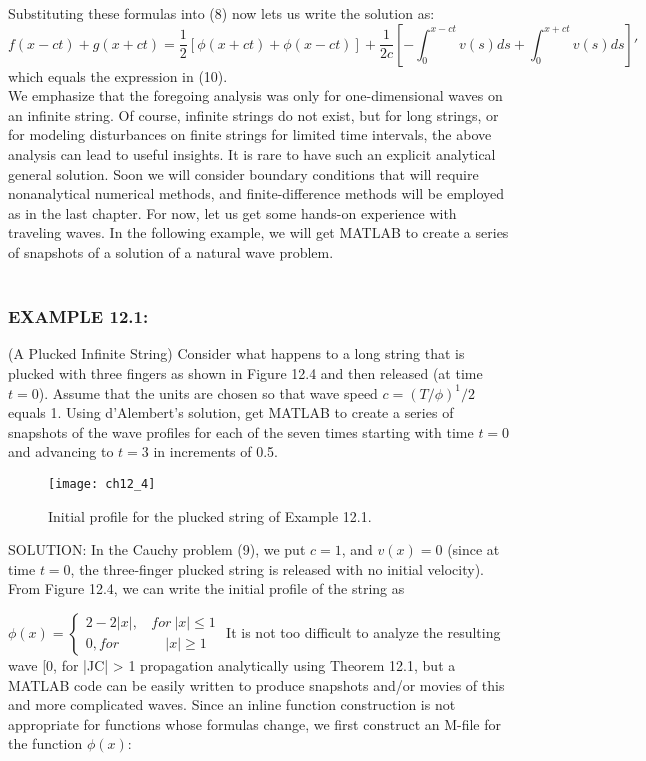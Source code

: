 \documentclass[../main.tex]{subfiles}
\begin{document}
Substituting these formulas into (8) now lets us write the solution as: 
$$f(x-ct) + g(x + ct)=\dfrac{1}{2} [\phi(x+ct)+\phi(x-ct)]+\dfrac{1}{2c} [-\int_{0}^{x-ct} v(s)ds+\int_{0}^{x+ct} v(s)ds]'$$
which equals the expression in (10). 
\\

We emphasize that the foregoing analysis was only for one-dimensional waves
on an infinite string. Of course, infinite strings do not exist, but for long strings, or
for modeling disturbances on finite strings for limited time intervals, the above
analysis can lead to useful insights. It is rare to have such an explicit analytical
general solution. Soon we will consider boundary conditions that will require
nonanalytical numerical methods, and finite-difference methods will be employed
as in the last chapter. For now, let us get some hands-on experience with
traveling waves. In the following example, we will get MATLAB to create a
series of snapshots of a solution of a natural wave problem.
\\
\\ 
\subsubsection{EXAMPLE 12.1:} (A Plucked Infinite String) Consider what happens to a long
string that is plucked with three fingers as shown in Figure 12.4 and then released
(at time $t = 0$). Assume that the units are chosen so that wave speed $c=(T/ \phi)^1/2$ equals 1. Using d'Alembert's solution, get MATLAB to create a series of
snapshots of the wave profiles for each of the seven times starting with time $t = 0$
and advancing to $t = 3$ in increments of 0.5. 
\begin{figure}[H]
	\centering
	\texttt{[image: ch12\_4]}
	\caption{\textsf{ Initial profile for the plucked string of Example 12.1.}}
	\label{pfig:ch12_4}
\end{figure}

SOLUTION: In the Cauchy problem (9), we put $c = 1$, and $v(x) = 0$ (since at
time $t = 0$, the three-finger plucked string is released with no initial velocity).
From Figure 12.4, we can write the initial profile of the string as

$\phi(x)=
\begin{cases} 2-2\vert x\vert,  ~~~~for~ \vert x\vert \leqslant 1\\
0, for  ~~~~~~~~~~~~~~~\vert x\vert\geqslant 1
\end{cases}$
It is not too difficult to analyze the resulting wave
[0, for |JC| > 1
propagation analytically using Theorem 12.1, but a MATLAB code can be easily
written to produce snapshots and/or movies of this and more complicated waves.
Since an inline function construction is not appropriate for functions whose
formulas change, we first construct an M-file for the function $\phi(x):$
\end{document}
